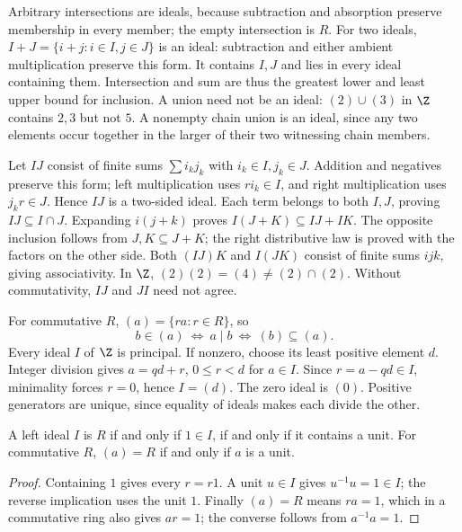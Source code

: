 Arbitrary intersections are ideals, because subtraction and absorption
preserve membership in every member; the empty intersection is $R$.
For two ideals, $I+J=\{i+j:i\in I,j\in J\}$ is an ideal: subtraction and
either ambient multiplication preserve this form. It contains $I,J$
and lies in every ideal containing them. Intersection and sum are thus
the greatest lower and least upper bound for inclusion.
A union need not be an ideal: $(2)\cup(3)$ in $\Z$ contains $2,3$ but
not $5$. A nonempty chain union is an ideal, since any two elements
occur together in the larger of their two witnessing chain members.

Let $IJ$ consist of finite sums $\sum i_kj_k$ with $i_k\in I,j_k\in J$.
Addition and negatives preserve this form; left multiplication uses
$ri_k\in I$, and right multiplication uses $j_kr\in J$. Hence $IJ$ is
a two-sided ideal. Each term belongs to both $I,J$, proving
$IJ\subseteq I\cap J$.
Expanding $i(j+k)$ proves $I(J+K)\subseteq IJ+IK$.
The opposite inclusion follows from $J,K\subseteq J+K$; the right
distributive law is proved with the factors on the other side.
Both $(IJ)K$ and $I(JK)$ consist of finite sums $ijk$, giving
associativity. In $\Z$, $(2)(2)=(4)\ne(2)\cap(2)$.
Without commutativity, $IJ$ and $JI$ need not agree.

For commutative $R$, $(a)=\{ra:r\in R\}$, so
\[
 b\in(a)\ \Longleftrightarrow\ a\mid b\
 \Longleftrightarrow\ (b)\subseteq(a).
\]
Every ideal $I$ of $\Z$ is principal. If nonzero, choose its least
positive element $d$. Integer division gives $a=qd+r$,
$0\le r<d$ for $a\in I$. Since $r=a-qd\in I$, minimality forces
$r=0$, hence $I=(d)$. The zero ideal is $(0)$. Positive generators
are unique, since equality of ideals makes each divide the other.

\begin{proposition}\label{prop:unit-ideal}
A left ideal $I$ is $R$ if and only if $1\in I$, if and only if it
contains a unit. For commutative $R$, $(a)=R$ if and only if $a$ is a unit.
\end{proposition}
\begin{proof}
Containing $1$ gives every $r=r1$. A unit $u\in I$ gives
$u^{-1}u=1\in I$; the reverse implication uses the unit $1$.
Finally $(a)=R$ means $ra=1$, which in a commutative ring also gives
$ar=1$; the converse follows from $a^{-1}a=1$.
\end{proof}

